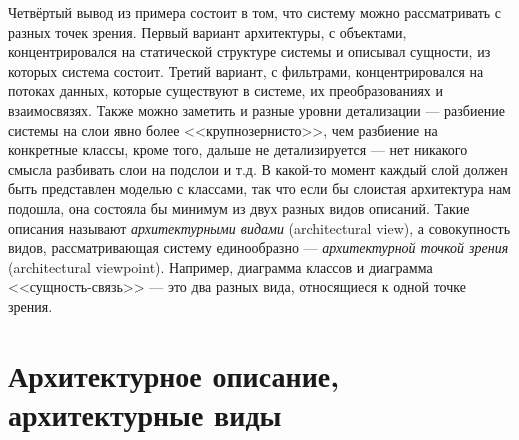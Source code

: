 \documentclass{../../text-style}
\begin{document}
Четвёртый вывод из примера состоит в том, что систему можно рассматривать с разных точек зрения. Первый вариант архитектуры, с объектами, концентрировался на статической структуре системы и описывал сущности, из которых система состоит. Третий вариант, с фильтрами, концентрировался на потоках данных, которые существуют в системе, их преобразованиях и взаимосвязях. Также можно заметить и разные уровни детализации --- разбиение системы на слои явно более <<крупнозернисто>>, чем разбиение на конкретные классы, кроме того, дальше не детализируется --- нет никакого смысла разбивать слои на подслои и т.д. В какой-то момент каждый слой должен быть представлен моделью с классами, так что если бы слоистая архитектура нам подошла, она состояла бы минимум из двух разных видов описаний. Такие описания называют \emph{архитектурными видами} (architectural view), а совокупность видов, рассматривающая систему единообразно --- \emph{архитектурной точкой зрения} (architectural viewpoint). Например, диаграмма классов и диаграмма <<сущность-связь>> --- это два разных вида, относящиеся к одной точке зрения.

\section{Архитектурное описание, архитектурные виды}
\end{document}
